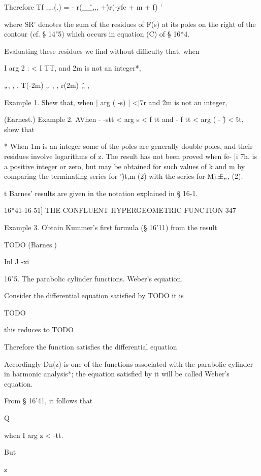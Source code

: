 Therefore Tf ,,..(.) = - r(\_\^\_,,, +\^)r(-yfc + m + f) ' 

where SR' denotes the sum of the residues of F(s) at its poles on the 
right of the contour (cf. § 14"5) which occurs in equation (C) of § 16*4. 

Evaluating these residues we find without difficulty that, when 

I arg 2 : < I TT, 
and 2m is not an integer*, 

„, , , T(-2m) ,. , , r(2m) ,\^ , , 

Example 1. Shew that, when | arg ( -s) | <|7r and 2m is not an integer, 

(Earnest.) 
Example 2. AVhen - -stt < arg s < f tt and - f tt < arg ( - \^) < \^tt, shew that 

* When 1m is an integer some of the poles are generally double poles, and their residues 
involve logarithms of z. The result has not been proved when fe- |i 7h. is a positive integer or 
zero, but may be obtained for such values of k and m by comparing the terminating series for 
'\^)t,m (2) with the series for Mj.\^±„, (2). 

t Barnes' results are given in the notation explained in § 16-1. 



16*41-16-51] THE CONFLUENT HYPERGEOMETRIC FUNCTION 347 

Example 3. Obtain Kummer's first formula (§ 16'11) from the result 

TODO (Barnes.) 

Inl J -xi 

16"5. The parabolic cylinder functions. Weber's equation. 

Consider the differential equation satisfied by TODO
it is 

TODO

this reduces to TODO

Therefore the function 
satisfies the differential equation 

Accordingly Dn(z) is one of the functions associated with the parabolic 
cylinder in harmonic analysis*; the equation satisfied by it will be called 
Weber's equation. 

From § 16'41, it follows that 

Q 

when I arg z < -tt. 



But 



z 



